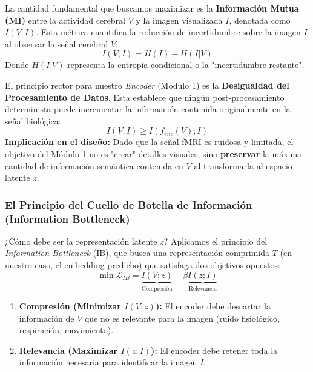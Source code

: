 \documentclass{article}
\begin{document}
La cantidad fundamental que buscamos maximizar es la \textbf{Información Mutua (MI)} entre la actividad cerebral $V$ y la imagen visualizada $I$, denotada como $I(V; I)$. Esta métrica cuantifica la reducción de incertidumbre sobre la imagen $I$ al observar la señal cerebral $V$:
\begin{equation}
    I(V; I) = H(I) - H(I|V)
\end{equation}
Donde $H(I|V)$ representa la entropía condicional o la "incertidumbre restante".

El principio rector para nuestro \textit{Encoder} (Módulo 1) es la \textbf{Desigualdad del Procesamiento de Datos}. Esta establece que ningún post-procesamiento determinista puede incrementar la información contenida originalmente en la señal biológica:
\begin{equation}
    I(V; I) \geq I(f_{enc}(V); I)
\end{equation}
\textbf{Implicación en el diseño:} Dado que la señal fMRI es ruidosa y limitada, el objetivo del Módulo 1 no es "crear" detalles visuales, sino \textbf{preservar} la máxima cantidad de información semántica contenida en $V$ al transformarla al espacio latente $z$.

\subsubsection{El Principio del Cuello de Botella de Información (Information Bottleneck)}

¿Cómo debe ser la representación latente $z$? Aplicamos el principio del \textit{Information Bottleneck} (IB), que busca una representación comprimida $T$ (en nuestro caso, el embedding predicho) que satisfaga dos objetivos opuestos:
\begin{equation}
    \min \mathcal{L}_{IB} = \underbrace{I(V; z)}_{\text{Compresión}} - \beta \underbrace{I(z; I)}_{\text{Relevancia}}
\end{equation}

\begin{enumerate}
    \item \textbf{Compresión (Minimizar $I(V; z)$):} El encoder debe descartar la información de $V$ que no es relevante para la imagen (ruido fisiológico, respiración, movimiento).
    \item \textbf{Relevancia (Maximizar $I(z; I)$):} El encoder debe retener toda la información necesaria para identificar la imagen $I$.
\end{enumerate}
\end{document}
